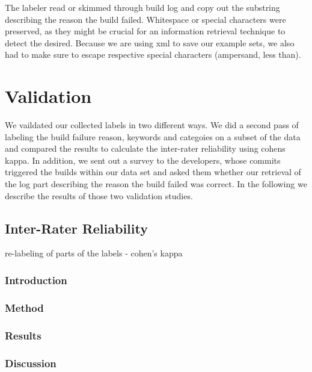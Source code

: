 \documentclass[\myrootdir/main.tex]{subfiles}
\begin{document}
The labeler read or skimmed through build log and copy out the substring describing the reason the build failed.
Whitespace or special characters were preserved, as they might be crucial for an information retrieval technique to detect the desired.
Because we are using xml to save our example sets, we also had to make sure to escape respective special characters (ampersand, less than).


\section{Validation}
We vaildated our collected labels in two different ways. We did a second pass of labeling the build failure reason, keywords and categoies on a subset of the data and compared the results to calculate the inter-rater reliability using cohens kappa. In addition, we sent out a survey to the developers, whose commits triggered the builds within our data set and asked them whether our retrieval of the log part describing the reason the build failed was correct. In the following we describe the results of those two validation studies.

\subsection{Inter-Rater Reliability}
re-labeling of parts of the labels - cohen's kappa
\subsubsection{Introduction}
\subsubsection{Method}
\subsubsection{Results}
\subsubsection{Discussion}
\end{document}
